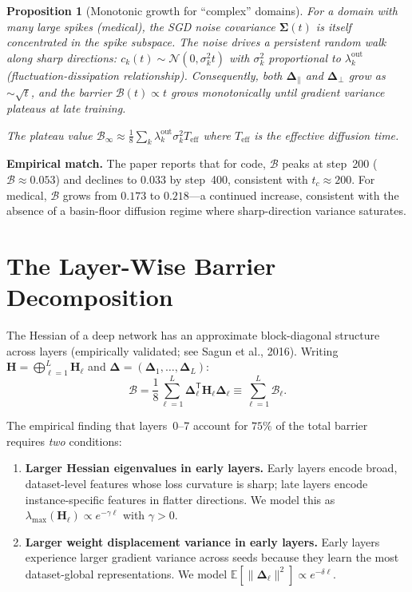 \documentclass{article}
\newtheorem{proposition}{Proposition}
\newcommand{\E}{\mathbb{E}}
\newcommand{\Hess}{\mathbf{H}}
\newcommand{\bDelta}{\bm{\Delta}}
\begin{document}
\begin{proposition}[Monotonic growth for ``complex'' domains]\label{prop:monotonic}
For a domain with many large spikes (medical), the SGD noise covariance $\bm{\Sigma}(t)$ is
\emph{itself} concentrated in the spike subspace. The noise drives a persistent random walk
along sharp directions: $c_k(t)\sim\mathcal{N}(0,\sigma_k^2 t)$ with $\sigma_k^2$ proportional
to $\lambda_k^{\mathrm{out}}$ (fluctuation-dissipation relationship).
Consequently, \emph{both} $\bDelta_\parallel$ and $\bDelta_\perp$ grow as $\sim\sqrt{t}$,
and the barrier $\mathcal{B}(t)\propto t$ grows monotonically until gradient variance
plateaus at late training.

The plateau value $\mathcal{B}_\infty \approx \frac{1}{8}\sum_k \lambda_k^{\mathrm{out}}\sigma_k^2 T_{\mathrm{eff}}$
where $T_{\mathrm{eff}}$ is the effective diffusion time.
\end{proposition}

\medskip\noindent
\textbf{Empirical match.}
The paper reports that for code, $\mathcal{B}$ peaks at step~200 ($\mathcal{B}\approx0.053$)
and declines to $0.033$ by step~400, consistent with $t_c\approx200$.
For medical, $\mathcal{B}$ grows from $0.173$ to $0.218$---a continued increase, consistent
with the absence of a basin-floor diffusion regime where sharp-direction variance saturates.

\section{The Layer-Wise Barrier Decomposition}

The Hessian of a deep network has an approximate block-diagonal structure across layers
(empirically validated; see Sagun et al., 2016). Writing $\Hess = \bigoplus_{\ell=1}^L\Hess_\ell$
and $\bDelta = (\bDelta_1,\dots,\bDelta_L)$:
\begin{equation}
\mathcal{B} = \frac{1}{8}\sum_{\ell=1}^L \bDelta_\ell^{\mathsf T}\Hess_\ell\bDelta_\ell
\equiv \sum_{\ell=1}^L \mathcal{B}_\ell.
\end{equation}

The empirical finding that layers~0--7 account for $75\%$ of the total barrier requires
\emph{two} conditions:
\begin{enumerate}
\item \textbf{Larger Hessian eigenvalues in early layers.}
Early layers encode broad, dataset-level features whose loss curvature is sharp;
late layers encode instance-specific features in flatter directions.
We model this as $\lambda_{\max}(\Hess_\ell) \propto e^{-\gamma\ell}$ with $\gamma>0$.
\item \textbf{Larger weight displacement variance in early layers.}
Early layers experience larger gradient variance across seeds because they learn
the most dataset-global representations. We model $\E[\|\bDelta_\ell\|^2]\propto e^{-\delta\ell}$.
\end{enumerate}
\end{document}
